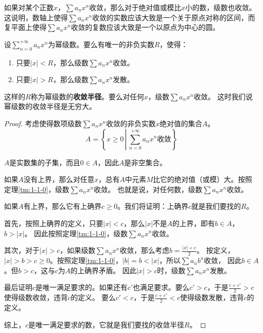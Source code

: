 \documentclass[12pt,UTF8]{ctexbook}
\begin{document}
如果对某个正数$x$，$\sum a_n x^n$收敛，那么对于绝对值或模比$x$小的数，级数也收敛。
这说明，数轴上使得$\sum a_n x^n$收敛的实数应该大致是一个关于原点对称的区间，而复平面上使得$\sum a_n x^n$收敛的复数应该大致是一个以原点为中心的圆。

\begin{tm}\label{tm:1-1-10}
    设$\displaystyle\sum_{n=0}^{+\infty} a_n x^n$为幂级数。要么有唯一的非负实数$R$，使得：
    \begin{enumerate}
        \item 只要$|x|<R$，那么级数$\sum a_n x^n$收敛。
        \item 只要$|x|>R$，那么级数$\sum a_n x^n$发散。
    \end{enumerate}
    这样的$R$称为幂级数的\textbf{收敛半径}。要么对任何$x$，级数$\sum a_n x^n$收敛。
    这时我们说幂级数的收敛半径是无穷大。
\end{tm}

\begin{proof}
    考虑使得数项级数$\sum a_n x^n$收敛的非负实数$x$绝对值的集合$A$。
    $$A = \left\{ x \geqslant 0 \, \left| \, \sum_{n=0}^{+\infty} a_n x^n \mbox{收敛} \right. \right\} $$

    $A$是实数集的子集，而且$0\in A$，因此$A$是非空集合。

    如果$A$没有上界，那么对任意$x$，总有$A$中元素$M$比它的绝对值（或模）大。按照定理\ref{tm:1-1-0}，级数$\sum a_n x^n$收敛。
    也就是说，对任何数，级数$\sum a_n x^n$收敛。

    如果$A$有上界，那么它有上确界$c\geqslant 0$。我们将证明：上确界$c$就是我们要找的$R$。
    
    首先，按照上确界的定义，只要$|x|<c$，那么$|x|$不是$A$的上界，即有$b\in A$，$b>|x|$。
    因此按照定理\ref{tm:1-1-0}，级数$\sum a_n x^n$收敛。

    其次，对于$|x|>c$，如果级数$\sum a_n x^n$收敛，那么考虑$b = \frac{|x| + c}{2}$。
    按定义，$|x| > b > c \geqslant 0$。按照定理\ref{tm:1-1-0}，$|b| = b < |x|$，所以$\sum a_n b^n$收敛，
    因此$b \in A$。但$b>c$，这与$c$为$A$的上确界矛盾。
    因此$|x|>c$时，级数$\sum a_n x^n$发散。

    最后证明$c$是唯一满足要求的。如果还有$c'$也满足要求。要么$c'>c$，于是$\frac{c+c'}{2} > c$使得级数收敛，违背$c$的定义。
    要么$c'<c$，于是$\frac{c+c'}{2} < c$使得级数发散，违背$c$的定义。

    综上，$c$是唯一满足要求的数，它就是我们要找的收敛半径$R$。

\end{proof}
\end{document}

